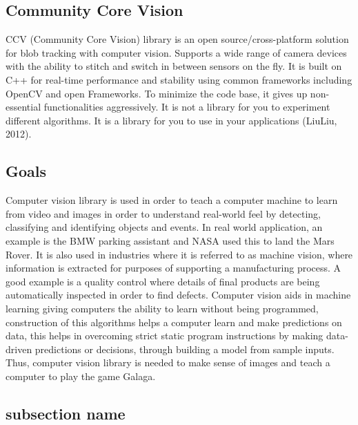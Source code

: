 \documentclass{scrreprt}
\begin{document}
\subsection{Community Core Vision}
CCV (Community Core Vision) library is an open source/cross-platform solution for blob tracking with computer vision.
Supports a wide range of camera devices with the ability to stitch and switch in between sensors on the fly.
It is built on C++ for real-time performance and stability using common frameworks including OpenCV and open Frameworks.
To minimize the code base, it gives up non-essential functionalities aggressively.
It is not a library for you to experiment different algorithms.
It is a library for you to use in your applications (LiuLiu, 2012).

\subsection{Goals}
Computer vision library is used in order to teach a computer machine to learn from video and images in order to understand real-world feel by detecting,
classifying and identifying objects and events.
In real world application, an example is the BMW parking assistant and NASA used this to land the Mars Rover.
It is also used in industries where it is referred to as machine vision, where information is extracted for purposes of supporting a manufacturing process.
A good example is a quality control where details of final products are being automatically inspected in order to find defects.
Computer vision aids in machine learning giving computers the ability to learn without being programmed,
construction of this algorithms helps a computer learn and make predictions on data,
this helps in overcoming strict static program instructions by making data-driven predictions or decisions,
through building a model from sample inputs.
Thus, computer vision library is needed to make sense of images and teach a computer to play the game Galaga.

\subsection{subsection name}
\end{document}
